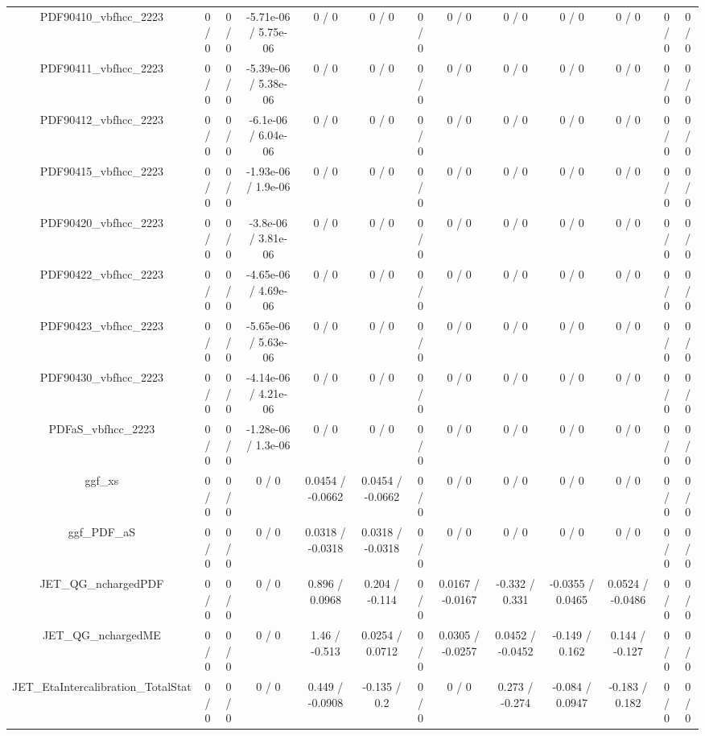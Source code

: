 \documentclass[10pt]{article}
\begin{document}
\begin{table}[htbp]
\begin{center}
\begin{tabular}{|c|c|c|c|c|c|c|c|c|c|c|c|c|}
  PDF90410_vbfhcc_2223 & 0 / 0 & 0 / 0 & -5.71e-06 / 5.75e-06 & 0 / 0 & 0 / 0 & 0 / 0 & 0 / 0 & 0 / 0 & 0 / 0 & 0 / 0 & 0 / 0 & 0 / 0 \\ 
  PDF90411_vbfhcc_2223 & 0 / 0 & 0 / 0 & -5.39e-06 / 5.38e-06 & 0 / 0 & 0 / 0 & 0 / 0 & 0 / 0 & 0 / 0 & 0 / 0 & 0 / 0 & 0 / 0 & 0 / 0 \\ 
  PDF90412_vbfhcc_2223 & 0 / 0 & 0 / 0 & -6.1e-06 / 6.04e-06 & 0 / 0 & 0 / 0 & 0 / 0 & 0 / 0 & 0 / 0 & 0 / 0 & 0 / 0 & 0 / 0 & 0 / 0 \\ 
  PDF90415_vbfhcc_2223 & 0 / 0 & 0 / 0 & -1.93e-06 / 1.9e-06 & 0 / 0 & 0 / 0 & 0 / 0 & 0 / 0 & 0 / 0 & 0 / 0 & 0 / 0 & 0 / 0 & 0 / 0 \\ 
  PDF90420_vbfhcc_2223 & 0 / 0 & 0 / 0 & -3.8e-06 / 3.81e-06 & 0 / 0 & 0 / 0 & 0 / 0 & 0 / 0 & 0 / 0 & 0 / 0 & 0 / 0 & 0 / 0 & 0 / 0 \\ 
  PDF90422_vbfhcc_2223 & 0 / 0 & 0 / 0 & -4.65e-06 / 4.69e-06 & 0 / 0 & 0 / 0 & 0 / 0 & 0 / 0 & 0 / 0 & 0 / 0 & 0 / 0 & 0 / 0 & 0 / 0 \\ 
  PDF90423_vbfhcc_2223 & 0 / 0 & 0 / 0 & -5.65e-06 / 5.63e-06 & 0 / 0 & 0 / 0 & 0 / 0 & 0 / 0 & 0 / 0 & 0 / 0 & 0 / 0 & 0 / 0 & 0 / 0 \\ 
  PDF90430_vbfhcc_2223 & 0 / 0 & 0 / 0 & -4.14e-06 / 4.21e-06 & 0 / 0 & 0 / 0 & 0 / 0 & 0 / 0 & 0 / 0 & 0 / 0 & 0 / 0 & 0 / 0 & 0 / 0 \\ 
  PDFaS_vbfhcc_2223 & 0 / 0 & 0 / 0 & -1.28e-06 / 1.3e-06 & 0 / 0 & 0 / 0 & 0 / 0 & 0 / 0 & 0 / 0 & 0 / 0 & 0 / 0 & 0 / 0 & 0 / 0 \\ 
  ggf_xs & 0 / 0 & 0 / 0 & 0 / 0 & 0.0454 / -0.0662 & 0.0454 / -0.0662 & 0 / 0 & 0 / 0 & 0 / 0 & 0 / 0 & 0 / 0 & 0 / 0 & 0 / 0 \\ 
  ggf_PDF_aS & 0 / 0 & 0 / 0 & 0 / 0 & 0.0318 / -0.0318 & 0.0318 / -0.0318 & 0 / 0 & 0 / 0 & 0 / 0 & 0 / 0 & 0 / 0 & 0 / 0 & 0 / 0 \\ 
  JET_QG_nchargedPDF & 0 / 0 & 0 / 0 & 0 / 0 & 0.896 / 0.0968 & 0.204 / -0.114 & 0 / 0 & 0.0167 / -0.0167 & -0.332 / 0.331 & -0.0355 / 0.0465 & 0.0524 / -0.0486 & 0 / 0 & 0 / 0 \\ 
  JET_QG_nchargedME & 0 / 0 & 0 / 0 & 0 / 0 & 1.46 / -0.513 & 0.0254 / 0.0712 & 0 / 0 & 0.0305 / -0.0257 & 0.0452 / -0.0452 & -0.149 / 0.162 & 0.144 / -0.127 & 0 / 0 & 0 / 0 \\ 
  JET_EtaIntercalibration_TotalStat & 0 / 0 & 0 / 0 & 0 / 0 & 0.449 / -0.0908 & -0.135 / 0.2 & 0 / 0 & 0 / 0 & 0.273 / -0.274 & -0.084 / 0.0947 & -0.183 / 0.182 & 0 / 0 & 0 / 0 \\ 

\end{tabular}
\end{center}
\end{table}
\end{document}
